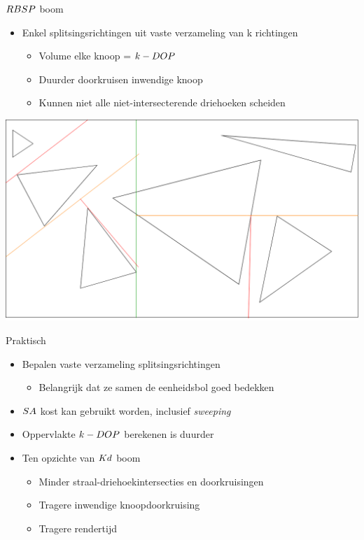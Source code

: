 \documentclass[11pt,t]{beamer}
\begin{document}
\begin{frame}{$RBSP$ boom}
	\begin{itemize}
		\item Enkel splitsingsrichtingen uit vaste verzameling van k richtingen
			\begin{itemize}
				\item Volume elke knoop = $k-DOP$
				\item Duurder doorkruisen inwendige knoop
				\item Kunnen niet alle niet-intersecterende driehoeken scheiden
			\end{itemize}
	\end{itemize}
	\vspace{5pt}
	\hspace{5pt}
	\includegraphics[height=0.5\paperheight]{../img/splitsing-RBSP}
\end{frame}

\begin{frame}{Praktisch}
	\begin{itemize}
	\item Bepalen vaste verzameling splitsingsrichtingen
	\begin{itemize}
		\item Belangrijk dat ze samen de eenheidsbol goed bedekken
	\end{itemize}
	\item $SA$ kost kan gebruikt worden, inclusief \textit{sweeping}
	\item Oppervlakte $k-DOP$ berekenen is duurder
	\item Ten opzichte van $Kd$ boom
		\begin{itemize}
			\item Minder straal-driehoekintersecties en doorkruisingen
			\item Tragere inwendige knoopdoorkruising
			\item Tragere rendertijd
		\end{itemize}
	\end{itemize}
\end{frame}
\end{document}
